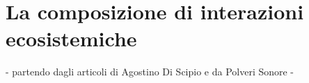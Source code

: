 \section{La composizione di interazioni ecosistemiche}
\label{sec:La composizione di interazioni ecosistemiche}

- partendo dagli articoli di Agostino Di Scipio e da Polveri Sonore -
